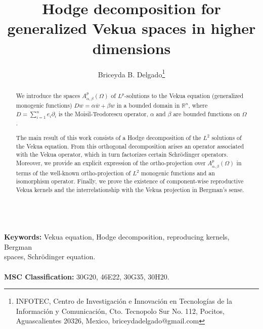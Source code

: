 \documentclass[12pt]{article}
\def\R{\mathbb{R}}
\newcommand{\JLb}[1]{\textcolor{blue}{#1}}
\begin{document}
 
\title{Hodge decomposition for generalized Vekua spaces in higher dimensions}
\author{Briceyda B. Delgado\thanks{INFOTEC, Centro de Investigación e Innovación en Tecnologías de la Información y Comunicación, Cto. Tecnopolo Sur No. 112, Pocitos, Aguascalientes 20326, Mexico, briceydadelgado@gmail.com}}
\date{}
\maketitle
\begin{abstract}
 We introduce the spaces $A^p_{\alpha, \beta}(\Omega)$ of $L^p$-solutions to the Vekua equation (generalized monogenic functions) $D w=\alpha\overline{w}+\beta w$ in a bounded domain in $\R^n$, where $D=\sum_{i=1}^n e_i \partial_i$ is the Moisil-Teodorescu operator, $\alpha$ and $\beta$ are bounded functions on $\Omega$. %
 
 The main result of this work consists of a Hodge decomposition of the $ L^2$ solutions of the Vekua equation. From this orthogonal decomposition arises an operator associated with the Vekua operator, which in turn factorizes certain Schrödinger operators.
Moreover, we provide an explicit expression of the ortho-projection over $A^p_{\alpha, \beta}(\Omega)$ in terms of the well-known ortho-projection of $L^2$ monogenic functions and an isomorphism operator. Finally, we prove the existence of component-wise reproductive Vekua kernels and the interrelationship with the Vekua projection in Bergman's sense. %
\end{abstract}
\mbox{}\\
\noindent \textbf{Keywords:} Vekua equation, Hodge decomposition, reproducing kernels, Bergman\\ spaces, Schrödinger equation.\\ 
\mbox{}\\
\noindent \textbf{MSC Classification:} 30G20, 46E22, 30G35, 30H20. 

\end{document}
